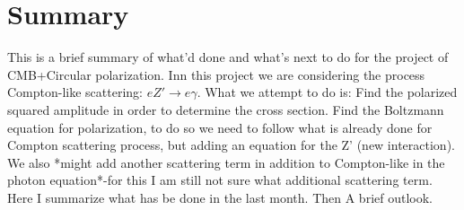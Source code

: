 \documentclass[amssymb,useAMS,prd,aps,amsmath,onecolumn,superscriptaddress,nofootinbib]{revtex4}
\begin{document}
\section{Summary}
This is a brief summary of what'd done and what's next to do for the project of CMB+Circular polarization. 
Inn this project we are considering the process Compton-like  scattering: $e Z'\rightarrow e\gamma$. What we attempt to do is: Find the polarized squared amplitude in order to determine the cross section. Find the Boltzmann equation for polarization, to do so we need to follow what is already  done for Compton scattering process, but adding an equation  for the Z' (new interaction). We also *might add another scattering term in addition to Compton-like in the photon equation*-for this I am still not sure what additional scattering term. Here I summarize what has be done in the last month. Then A brief outlook.
\end{document}
